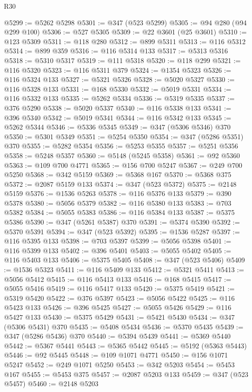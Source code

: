 \begin{lexlean}{R30}
\begin{coremodule}
@5299 := @5262 @5298
@5301 := @347 (@523 @5299)
@5305 := @94 @280 (@94 @299 @100)
@5306 := @527 @5305
@5309 := @22 @3601 (@25 @3601)
@5310 := @123 @5309
@5311 := @118 @280
@5312 := @899 @5311
@5313 := @116 @5312
@5314 := @899 @359
@5316 := @116 @5314 @133
@5317 := @5313 @5316
@5318 := @5310 @5317
@5319 := @111 @5318
@5320 := @118 @299
@5321 := @116 @5320
@5323 := @116 @5311 @379
@5324 := @1354 @5323
@5326 := @116 @5324 @133
@5327 := @5321 @5326
@5328 := @5020 @5327
@5330 := @116 @5328 @133
@5331 := @168 @5330
@5332 := @5019 @5331
@5334 := @116 @5332 @133
@5335 := @5262 @5334
@5336 := @5319 @5335
@5337 := @376 @5290
@5338 := @5020 @5337
@5340 := @116 @5338 @133
@5341 := @396 @5340
@5342 := @5019 @5341
@5344 := @116 @5342 @133
@5345 := @5262 @5344
@5346 := @5336 @5345
@5349 := @347 (@5306 @5346) @370
@5350 := @5301 @5349
@5351 := @5254 @5350
@5354 := @347 (@5286 @5351) @370
@5355 := @5282 @5354
@5356 := @5253 @5355
@5357 := @5251 @5356
@5358 := @5248 @5357
@5360 := @5148 (@5245 @5358)
@5361 := @92 @5360
@5363 := @109 @700 @4771
@5365 := @156 @700 @5247
@5367 := @249 @700 @5250
@5368 := @342 @5159
@5369 := @5368 @167
@5370 := @5368 @375
@5372 := @2087 @5159 @133
@5374 := @347 (@523 @5372)
@5375 := @2148 @5159
@5376 := @1536 @5263
@5378 := @116 @5376 @133
@5379 := @390 @5378
@5380 := @5056 @5379
@5382 := @116 @5380 @133
@5383 := @703 @5382
@5384 := @5055 @5383
@5386 := @116 @5384 @133
@5387 := @5375 @5386
@5390 := @347 (@5261 @5387) @370
@5391 := @5374 @5390
@5392 := @5370 @5391
@5394 := @347 (@523 @5392)
@5395 := @1536 @5287
@5397 := @116 @5395 @133
@5398 := @703 @5397
@5399 := @5056 @5398
@5401 := @116 @5399 @133
@5402 := @396 @5401
@5403 := @5055 @5402
@5405 := @116 @5403 @133
@5406 := @5375 @5405
@5408 := @347 (@523 @5406)
@5409 := @1536 @5323
@5411 := @116 @5409 @133
@5412 := @5321 @5411
@5413 := @5056 @5412
@5415 := @116 @5413 @133
@5416 := @168 @5415
@5417 := @5055 @5416
@5419 := @116 @5417 @133
@5420 := @5375 @5419
@5421 := @5319 @5420
@5422 := @376 @5397
@5423 := @5056 @5422
@5425 := @116 @5423 @133
@5426 := @396 @5425
@5427 := @5055 @5426
@5429 := @116 @5427 @133
@5430 := @5375 @5429
@5431 := @5421 @5430
@5434 := @347 (@5306 @5431) @370
@5435 := @5408 @5434
@5436 := @5370 @5435
@5439 := @347 (@5286 @5436) @370
@5440 := @5394 @5439
@5441 := @5369 @5440
@5442 := @5367 @5441
@5443 := @5365 @5442
@5445 := @5192 (@5363 @5443)
@5446 := @92 @5445
@5448 := @109 @1071 @4771
@5450 := @156 @1071 @5247
@5452 := @249 @1071 @5250
@5453 := @342 @5203
@5454 := @5453 @167
@5455 := @5453 @375
@5457 := @2087 @5203 @133
@5459 := @347 (@523 @5457)
@5460 := @2148 @5203

\end{coremodule}
\end{lexlean}
